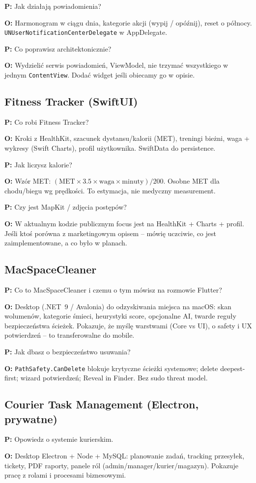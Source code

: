 \documentclass[11pt,a4paper]{article}
\newcommand{\pyt}[1]{\par\medskip\noindent\textbf{P:} #1\par}
\newcommand{\odp}[1]{\noindent\textbf{O:} #1\par}
\begin{document}
\pyt{Jak działają powiadomienia?}
\odp{Harmonogram w ciągu dnia, kategorie akcji (wypij / opóźnij), reset o północy. \texttt{UNUserNotificationCenterDelegate} w AppDelegate.}

\pyt{Co poprawisz architektonicznie?}
\odp{Wydzielić serwis powiadomień, ViewModel, nie trzymać wszystkiego w jednym \texttt{ContentView}. Dodać widget jeśli obiecamy go w opisie.}

\subsection{Fitness Tracker (SwiftUI)}

\pyt{Co robi Fitness Tracker?}
\odp{Kroki z HealthKit, szacunek dystansu/kalorii (MET), treningi bieżni, waga + wykresy (Swift Charts), profil użytkownika. SwiftData do persistence.}

\pyt{Jak liczysz kalorie?}
\odp{Wzór MET: $(\mathrm{MET}\times 3.5\times \mathrm{waga}\times \mathrm{minuty})/200$. Osobne MET dla chodu/biegu wg prędkości. To estymacja, nie medyczny measurement.}

\pyt{Czy jest MapKit / zdjęcia postępów?}
\odp{W aktualnym kodzie publicznym focus jest na HealthKit + Charts + profil. Jeśli ktoś porówna z marketingowym opisem -- mówię uczciwie, co jest zaimplementowane, a co było w planach.}

\subsection{MacSpaceCleaner}

\pyt{Co to MacSpaceCleaner i czemu o tym mówisz na rozmowie Flutter?}
\odp{Desktop (.NET~9 / Avalonia) do odzyskiwania miejsca na macOS: skan wolumenów, kategorie śmieci, heurystyki score, opcjonalne AI, twarde reguły bezpieczeństwa ścieżek. Pokazuje, że myślę warstwami (Core vs UI), o safety i UX potwierdzeń -- to transferowalne do mobile.}

\pyt{Jak dbasz o bezpieczeństwo usuwania?}
\odp{\texttt{PathSafety.CanDelete} blokuje krytyczne ścieżki systemowe; delete deepest-first; wizard potwierdzeń; Reveal in Finder. Bez sudo threat model.}

\subsection{Courier Task Management (Electron, prywatne)}

\pyt{Opowiedz o systemie kurierskim.}
\odp{Desktop Electron + Node + MySQL: planowanie zadań, tracking przesyłek, tickety, PDF raporty, panele ról (admin/manager/kurier/magazyn). Pokazuje pracę z rolami i procesami biznesowymi.}
\end{document}

